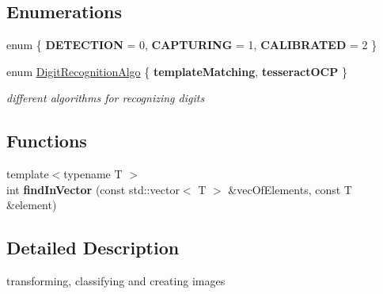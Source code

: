 \subsection*{Enumerations}
\begin{DoxyCompactItemize}
\item 
\mbox{\label{namespace_image_processing_ac44aa6095f14cd8f892fe802e71c228b}} 
enum \{ {\bfseries D\+E\+T\+E\+C\+T\+I\+ON} = 0, 
{\bfseries C\+A\+P\+T\+U\+R\+I\+NG} = 1, 
{\bfseries C\+A\+L\+I\+B\+R\+A\+T\+ED} = 2
 \}
\item 
\mbox{\label{namespace_image_processing_afe66b5cb462eb22dcf108308418c09eb}} 
enum \mbox{\hyperlink{namespace_image_processing_afe66b5cb462eb22dcf108308418c09eb}{Digit\+Recognition\+Algo}} \{ {\bfseries template\+Matching}, 
{\bfseries tesseract\+O\+CP}
 \}
\begin{DoxyCompactList}\small\item\em different algorithms for recognizing digits \end{DoxyCompactList}\end{DoxyCompactItemize}
\subsection*{Functions}
\begin{DoxyCompactItemize}
\item 
\mbox{\label{namespace_image_processing_a87e697d0a25a31287e73dc3e3a3cfe66}} 
{\footnotesize template$<$typename T $>$ }\\int {\bfseries find\+In\+Vector} (const std\+::vector$<$ T $>$ \&vec\+Of\+Elements, const T \&element)
\end{DoxyCompactItemize}


\subsection{Detailed Description}
transforming, classifying and creating images 